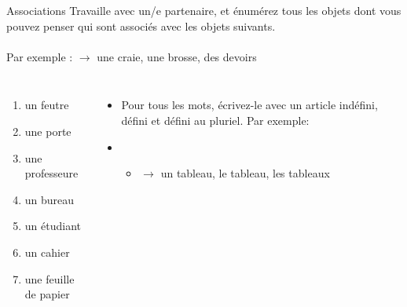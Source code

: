 \begin{frame}{Associations }
  Travaille avec un/e partenaire, et énumérez tous les objets dont vous pouvez penser qui sont associés avec les objets suivants. \\
   \\
  Par exemple :  $\to$ une craie, une brosse, des devoirs
  \begin{columns}
      \begin{enumerate}
        \item un feutre
        \item une porte
        \item une professeure
        \item un bureau
        \item un étudiant
        \item un cahier
        \item une feuille de papier
      \end{enumerate}
      \begin{itemize}
        \item<2-> Pour tous les mots, écrivez-le avec un article indéfini, défini et défini au pluriel. Par exemple:
        \item<2->[] 
        \begin{itemize}
          \item<2->  $\to$ \alert{un} tableau, \alert{le} tableau, \alert{les} tableau\alert{x}
        \end{itemize}
      \end{itemize}
  \end{columns}
\end{frame}